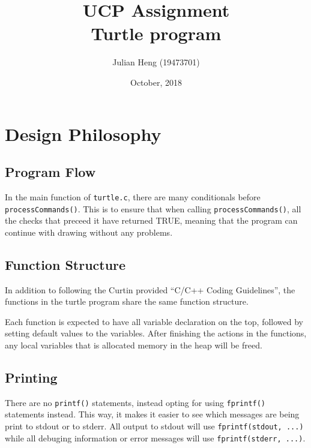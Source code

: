 \documentclass[a4paper, 12pt, titlepage]{article}
\title{\huge \textbf{UCP Assignment\\Turtle program}}
\author{Julian Heng (19473701)}
\date{October, 2018}
\newcommand{\code}[1]{\small\texttt{#1}\normalsize}
\begin{document}
\maketitle
\tableofcontents
\newpage

\pagestyle{fancy}

\fancyhf[FC]{\thepage}

\section{Design Philosophy}

\subsection{Program Flow}

In the main function of \code{turtle.c}, there are many conditionals 
before \code{processCommands()}. This is to ensure that when calling 
\code{processCommands()}, all the checks that preceed it have returned 
TRUE, meaning that the program can continue with drawing without any 
problems.

\subsection{Function Structure}

In addition to following the Curtin provided ``C/C++ Coding Guidelines'', 
the functions in the turtle program share the same function structure.

Each function is expected to have all variable declaration on the top, 
followed by setting default values to the variables. After finishing the 
actions in the functions, any local variables that is allocated memory 
in the heap will be freed.

\subsection{Printing}

There are no \code{printf()} statements, instead opting for using 
\code{fprintf()} statements instead. This way, it makes it easier to 
see which messages are being print to stdout or to stderr. All output 
to stdout will use \code{fprintf(stdout, ...)} while all debuging 
information or error messages will use \code{fprintf(stderr, ...)}.
\end{document}

